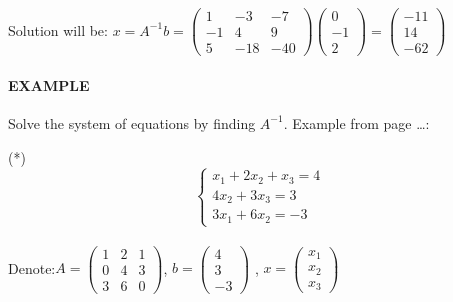 \documentclass[]{article}
\let\oldparagraph\paragraph
\renewcommand{\paragraph}[1]{\oldparagraph{#1}\mbox{}}
\begin{document}
Solution will be:
\(x = A^{-1}b=\begin{pmatrix} 1 & -3 & -7\\ -1 & 4 & 9 \\ 5 & -18 & -40 \end{pmatrix}\begin{pmatrix} 0\\ -1\\ 2 \end{pmatrix}=\begin{pmatrix} -11\\ 14\\ -62 \end{pmatrix}\)\\

\paragraph{\texorpdfstring{EXAMPLE\\
}{EXAMPLE }}\label{example-13}

Solve the system of equations by finding \(A^{-1}\). Example from page
\ldots{}:

(*)
\[\begin{cases} x_1 + 2x_2 +x_3= 4\\ 4x_2 + 3x_3 = 3\\3x_1 + 6x_2 = -3 \end{cases}\]\\[2\baselineskip]Denote:\(A=\begin{pmatrix} 1 & 2 & 1\\ 0 & 4 & 3 \\ 3 & 6 & 0\end{pmatrix}\),
\(b=\begin{pmatrix} 4\\ 3 \\-3\end{pmatrix}\) ,
\(x=\begin{pmatrix} x_1\\ x_2 \\x_3\end{pmatrix}\)\\
\end{document}
